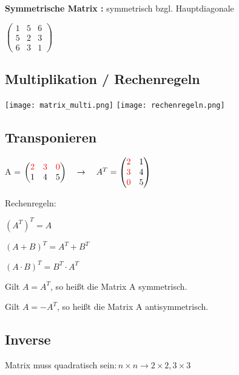 \begin{multicols*}{3}
    \textbf{Symmetrische Matrix :} symmetrisch bzgl. Hauptdiagonale

    $ \begin{pmatrix}
            1 & 5 & 6 \\
            5 & 2 & 3 \\
            6 & 3 & 1
        \end{pmatrix} $

    \WhiteSpace
    \subsection{Multiplikation / Rechenregeln}
    {\begin{multicols}{2}
            { \texttt{[image: matrix\_multi.png]} }
            \columnbreak
            { \texttt{[image: rechenregeln.png]} }
        \end{multicols}}

    \subsection{Transponieren}

    A = $\begin{pmatrix} {\color{red}2} & {\color{red}3} & {\color{red}0} \\ 1 & 4 & 5 \end{pmatrix} \quad
        \rightarrow
        \quad A^{T} = \begin{pmatrix} {\color{red}2} & 1 \\ {\color{red}3} & 4 \\ {\color{red}0} & 5 \end{pmatrix}
    $

    {Rechenregeln:}

    $ \left(A^{T}\right)^{T} = A $

    $ \left(A + B\right)^{T} = A^{T} + B^{T} $

    $ \left(A \cdot B\right)^{T} = B^{T} \cdot A^{T} $

    {Gilt $ A = A^{T} $, so heißt die Matrix A symmetrisch.}


    {Gilt $ A = -A^{T} $, so heißt die Matrix A antisymmetrisch.}

    \subsection{Inverse}
    {Matrix muss quadratisch sein$: n \times n \rightarrow 2\times2, 3\times3$}


\end{multicols*}
